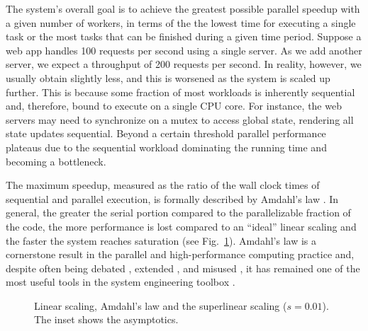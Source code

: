 The system's overall goal is to achieve the greatest possible parallel speedup with a given number of workers, in terms of the the lowest time for executing a single task or the most tasks that can be finished during a given time period.  Suppose a web app handles 100 requests per second using a single server. As we add another server, we expect a throughput of 200 requests per second. In reality, however, we usually obtain slightly less, and this is worsened as the system is scaled up further. This is because some fraction of most workloads is inherently sequential and, therefore, bound to execute on a single CPU core. For instance, the web servers may need to synchronize on a mutex to access global state, rendering all state updates sequential.  Beyond a certain threshold parallel performance plateaus due to the sequential workload dominating the running time and becoming a bottleneck.

The maximum speedup, measured as the ratio of the wall clock times of sequential and parallel execution, is formally described by Amdahl's law \cite{10.1145/1465482.1465560}. In general, the greater the serial portion compared to the parallelizable fraction of the code, the more performance is lost compared to an ``ideal'' linear scaling and the faster the system reaches saturation (see Fig.~\ref{fig:amdahl}). Amdahl's law is a cornerstone result in the parallel and high-performance computing practice and, despite often being debated \cite{10.1145/42411.42415}, extended \cite{4563876, 6280307,1580395,406581,6163449}, and misused \cite{10.5555/775339.775386}, it has remained one of the most useful tools in the system engineering toolbox \cite{10.5555/1951599}.

\begin{figure}[t]
  \centering
  \begin{small}
  
\end{small}
  \caption{Linear scaling, Amdahl's law and the superlinear scaling ($s=0.01$). The inset shows the asymptotics.}
  \label{fig:amdahl}
\end{figure}

